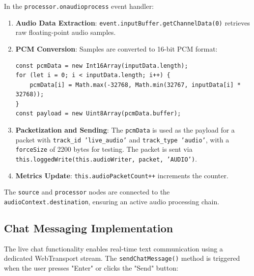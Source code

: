 In the \texttt{processor.onaudioprocess} event handler:

\begin{enumerate}
    \item \textbf{Audio Data Extraction}: \texttt{event.inputBuffer.getChannelData(0)} retrieves raw floating-point audio samples.
    \item \textbf{PCM Conversion}: Samples are converted to 16-bit PCM format:
    \begin{lstlisting}[breaklines=true,basicstyle=\small\ttfamily,frame=single]
const pcmData = new Int16Array(inputData.length);
for (let i = 0; i < inputData.length; i++) {
    pcmData[i] = Math.max(-32768, Math.min(32767, inputData[i] * 32768));
}
const payload = new Uint8Array(pcmData.buffer);
    \end{lstlisting}
    \item \textbf{Packetization and Sending}: The \texttt{pcmData} is used as the payload for a packet with \texttt{track\_id 'live\_audio'} and \texttt{track\_type 'audio'}, with a \texttt{forceSize} of 2200 bytes for testing. The packet is sent via \texttt{this.loggedWrite(this.audioWriter, packet, 'AUDIO')}.
    \item \textbf{Metrics Update}: \texttt{this.audioPacketCount++} increments the counter.
\end{enumerate}

The \texttt{source} and \texttt{processor} nodes are connected to the \texttt{audioContext.destination}, ensuring an active audio processing chain.

\subsection{Chat Messaging Implementation}
The live chat functionality enables real-time text communication using a dedicated WebTransport stream. The \texttt{sendChatMessage()} method is triggered when the user presses "Enter" or clicks the "Send" button:


